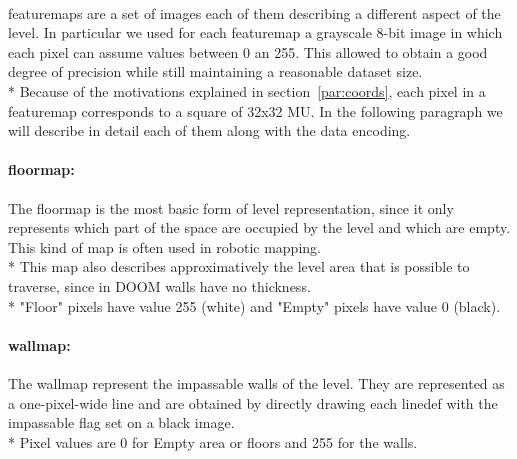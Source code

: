 \paragraph{} \glspl{featuremap} are a set of images each of them describing a different aspect of the level. In particular we used for each \gls{featuremap} a grayscale 8-bit image in which each pixel can assume values between 0 an 255. This allowed to obtain a good degree of precision while still maintaining a reasonable dataset size. \\*
Because of the motivations explained in section~\ref{par:coords}, each pixel in a \gls{featuremap} corresponds to a square of 32x32 \gls{MU}. 
In the following paragraph we will describe in detail each of them along with the data encoding.

\paragraph{\gls{floormap}:} The \gls{floormap} is the most basic form of level representation, since it only represents which part of the space are occupied by the level and which are empty. This kind of map is often used in robotic mapping. \\*
This map also describes approximatively the level area that is possible to traverse, since in DOOM walls have no thickness. \\*
"Floor" pixels have value 255 (white) and "Empty" pixels have value 0 (black).

\paragraph{\gls{wallmap}:} The \gls{wallmap} represent the impassable walls of the level. They are represented as a one-pixel-wide line and are obtained by directly drawing each \gls{linedef} with the impassable flag set on a black image. \\*
Pixel values are 0 for Empty area or floors and 255 for the walls.


